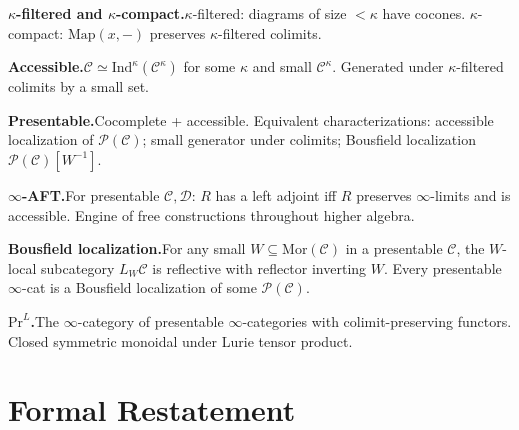 \begin{summarybox}
\textbf{$\kappa$-filtered and $\kappa$-compact.}\quad $\kappa$-filtered:
diagrams of size $< \kappa$ have cocones. $\kappa$-compact: $\mathrm{Map}(x, -)$
preserves $\kappa$-filtered colimits.

\textbf{Accessible.}\quad $\mathcal{C} \simeq \mathrm{Ind}^\kappa(\mathcal{C}^\kappa)$
for some $\kappa$ and small $\mathcal{C}^\kappa$. Generated under
$\kappa$-filtered colimits by a small set.

\textbf{Presentable.}\quad Cocomplete + accessible. Equivalent
characterizations: accessible localization of $\mathcal{P}(\mathcal{C})$;
small generator under colimits; Bousfield localization $\mathcal{P}(\mathcal{C})[W^{-1}]$.

\textbf{$\infty$-AFT.}\quad For presentable $\mathcal{C}, \mathcal{D}$:
$R$ has a left adjoint iff $R$ preserves $\infty$-limits and is accessible.
Engine of free constructions throughout higher algebra.

\textbf{Bousfield localization.}\quad For any small $W \subseteq
\mathrm{Mor}(\mathcal{C})$ in a presentable $\mathcal{C}$, the
$W$-local subcategory $L_W \mathcal{C}$ is reflective with reflector
inverting $W$. Every presentable $\infty$-cat is a Bousfield localization
of some $\mathcal{P}(\mathcal{C})$.

\textbf{$\mathrm{Pr}^L$.}\quad The $\infty$-category of presentable
$\infty$-categories with colimit-preserving functors. Closed symmetric
monoidal under Lurie tensor product.
\end{summarybox}


\section*{Formal Restatement}

